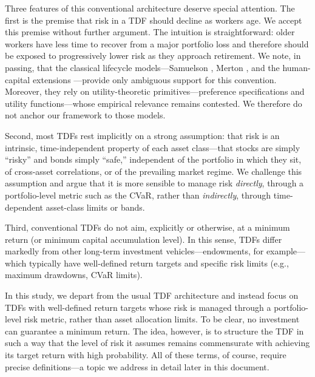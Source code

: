 \documentclass[11pt]{article}
\begin{document}
Three features of this conventional architecture deserve special 
attention. The first is the premise that risk in a TDF should decline 
as workers age. We accept this premise without further argument. The 
intuition is straightforward: older workers have less time to recover 
from a major portfolio loss and therefore should be exposed to 
progressively lower risk as they approach retirement. We note, in 
passing, that the classical lifecycle models---Samuelson 
\cite{samuelson1969}, Merton \cite{merton1969}, and the human-capital 
extensions \cite{bodie1992,gomes2008,cocco2005}---provide only 
ambiguous support for this convention.  Moreover, they rely  on utility-theoretic 
primitives---preference specifications and utility functions---whose 
empirical relevance remains contested. We therefore do not anchor our 
framework to those models.

Second, most TDFs rest implicitly on a strong assumption: that risk 
is an intrinsic, time-independent property of each asset class---that 
stocks are simply ``risky'' and bonds simply ``safe,'' independent of 
the portfolio in which they sit, of cross-asset correlations, or of 
the prevailing market regime. We challenge this assumption and argue 
that it is more sensible to manage risk \emph{directly}, through a 
portfolio-level metric such as the CVaR, rather than \emph{indirectly}, 
through time-dependent asset-class limits or bands.

Third, conventional TDFs do not aim, explicitly or otherwise, at a minimum return (or minimum capital accumulation level). In this sense, TDFs differ markedly from other long-term investment vehicles---endowments, for example---which typically have well-defined return targets and specific risk limits (e.g., maximum drawdowns, CVaR limits).

In this study, we depart from the usual TDF architecture and instead focus on TDFs with well-defined return targets whose risk is managed through a portfolio-level risk metric, rather than asset allocation limits. To be clear, no investment can guarantee a minimum return. The idea, however, is to structure the TDF in such a way that the level of risk it assumes remains commensurate with achieving its target return with high probability. All of these terms, of course, require precise definitions---a topic we address in detail later in this document.
\end{document}
